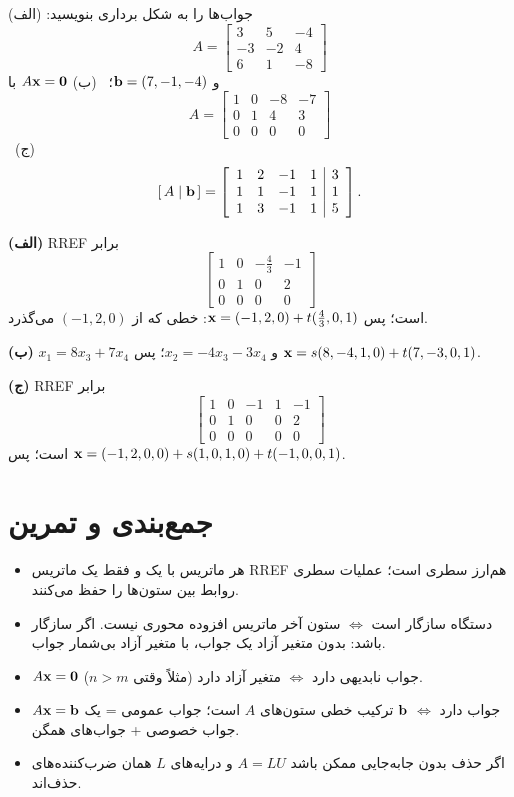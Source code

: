 \begin{example}
جواب‌ها را به شکل برداری بنویسید:
(الف) 
\[
A=\begin{bmatrix}3&5&-4\\-3&-2&4\\6&1&-8\end{bmatrix}
\]
 و $\mathbf{b}=(7,-1,-4)$؛ \
(ب) $A\mathbf{x}=\mathbf{0}$ با 
\[
A=\begin{bmatrix}1&0&-8&-7\\0&1&4&3\\0&0&0&0\end{bmatrix}
\]
 \
(ج) 
\[
\left[\,A\;\middle|\;\mathbf{b}\,\right]=\left[\begin{array}{cccc|c}1&2&-1&1&3\\1&1&-1&1&1\\1&3&-1&1&5\end{array}\right].
\]

\end{example}
\begin{solution}
\textbf{(الف)} RREF برابر 
\[
\left[\begin{array}{ccc|c}1&0&-\frac43&-1\\0&1&0&2\\0&0&0&0\end{array}\right]
\]
است؛ پس $\mathbf{x}=(-1,2,0)+t(\frac43,0,1)$: خطی که از $(-1,2,0)$ می‌گذرد.

\textbf{(ب)} $x_1=8x_3+7x_4$ و $x_2=-4x_3-3x_4$؛ پس $\mathbf{x}=s(8,-4,1,0)+t(7,-3,0,1)$.

\textbf{(ج)} RREF برابر 
\[
\left[\begin{array}{cccc|c}1&0&-1&1&-1\\0&1&0&0&2\\0&0&0&0&0\end{array}\right]
\]
است؛ پس $\mathbf{x}=(-1,2,0,0)+s(1,0,1,0)+t(-1,0,0,1)$.
\end{solution}

\section{جمع‌بندی و تمرین}

\begin{summary}
\begin{itemize}
  \item هر ماتریس با یک و فقط یک ماتریس RREF هم‌ارز سطری است؛ عملیات سطری روابط بین ستون‌ها را حفظ می‌کنند.
  \item دستگاه سازگار است $\iff$ ستون آخر ماتریس افزوده محوری نیست. اگر سازگار باشد: بدون متغیر آزاد یک جواب، با متغیر آزاد بی‌شمار جواب.
  \item $A\mathbf{x}=\mathbf{0}$ جواب نابدیهی دارد $\iff$ متغیر آزاد دارد (مثلاً وقتی $n>m$).
  \item $A\mathbf{x}=\mathbf{b}$ جواب دارد $\iff$ $\mathbf{b}$ ترکیب خطی ستون‌های $A$ است؛ جواب عمومی = یک جواب خصوصی + جواب‌های همگن.
  \item اگر حذف بدون جابه‌جایی ممکن باشد $A=LU$ و درایه‌های $L$ همان ضرب‌کننده‌های حذف‌اند.
\end{itemize}
\end{summary}

